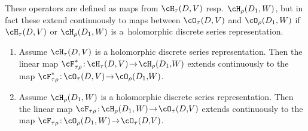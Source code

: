 These operators are defined as maps from $\cH_\tau(D,V)$ resp.~$\cH_\rho(D_1,W)$, but in fact these extend continuously to maps between
$\cO_\tau(D,V)$ and $\cO_\rho(D_1,W)$ if $\cH_\tau(D,V)$ or $\cH_\rho(D_1,W)$ is a~holomorphic discrete series representation.
\begin{Theorem}\label{conti_ext}\quad
\begin{enumerate}\itemsep=0pt
\item[$(1)$] Assume $\cH_\tau(D,V)$ is a holomorphic discrete series representation. Then
the linear map $\cF_{\tau\rho}^*\colon\! \cH_\tau(D,V)\!\to\!\cH_\rho(D_1{,}W)$ extends continuously to the map $\cF_{\tau\rho}^*\colon\! \cO_\tau(D,V)\!\to\!\cO_\rho(D_1{,}W)$.
\item[$(2)$] Assume $\cH_\rho(D_1,W)$ is a holomorphic discrete series representation. Then
the linear map $\cF_{\tau\rho}\colon\! \cH_\rho(D_1,W)\!\to\! \cO_\tau(D{,}V)$ extends continuously to the map $\cF_{\tau\rho}\colon\! \cO_\rho(D_1,W)\!\to \! \cO_\tau(D{,}V)$.
\end{enumerate}
\end{Theorem}
